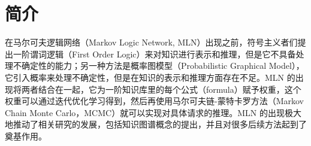 \documentclass[a4paper, AutoFakeBold]{article}
\title{\mytitle}
\author{宋超}
\date{\today}
\begin{document}
\maketitle

\setcounter{page}{1}
\begin{abstract}
自知识图谱（Knowledge Graph, KG）的概念提出以来，各大企业、机构纷纷利用知识图谱构建了庞大的知识库（Knowledge Base, KB）。但是由于知识库的不完备性，如何利用已有知识预测缺失的知识，从而完善知识库这个问题被提了出来，进而出现了知识图完备（Knowledge Graph Completion, KGC）相关的研究。然而现实世界中的知识往往不是一成不变的，于是近年来又出现了带时间信息的知识库（Temporal Knowledge Base, TKB），以及相应的时序知识图完备\cite{2023survey}（Temporal Knowledge Graph Completion, TKGC，或称时序知识图推理\cite{7-2021} Temporal Knowledge Graph Reasoning，TKGR）相关的研究。本文通过调研目前主流的研究方法与分类方式，选择了我们认为具有代表性的三个框架 TLogic, MPNet, ECEformer 来介绍当前 TKGC 的最新进展。
\end{abstract}

\section{简介}

在马尔可夫逻辑网络（Markov Logic Network, MLN）出现之前，符号主义者们提出一阶谓词逻辑（First Order Logic）来对知识进行表示和推理，但是它不具备处理不确定性的能力；另一种方法是概率图模型（Probabilistic Graphical Model），它引入概率来处理不确定性，但是在知识的表示和推理方面存在不足。MLN 的出现将两者结合在一起，它为一阶知识库里的每个公式（formula）赋予权重，这个权重可以通过迭代优化学习得到，然后再使用马尔可夫链-蒙特卡罗方法\cite{20-1996}（Markov Chain Monte Carlo，MCMC）就可以实现对具体请求的推理\cite{2006mln}。MLN 的出现极大地推动了相关研究的发展，包括知识图谱概念的提出\cite{8-2024}，并且对很多后续方法起到了奠基作用。
\end{document}
